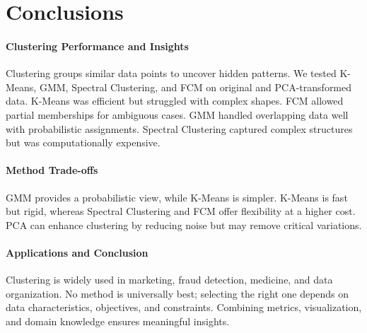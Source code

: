 \documentclass[11pt,a4paper]{article}
\begin{document}
\section{Conclusions}
\paragraph{Clustering Performance and Insights}
Clustering groups similar data points to uncover hidden patterns. We tested K-Means, GMM, Spectral Clustering, and FCM on original and PCA-transformed data. K-Means was efficient but struggled with complex shapes. FCM allowed partial memberships for ambiguous cases. GMM handled overlapping data well with probabilistic assignments. Spectral Clustering captured complex structures but was computationally expensive.

\paragraph{Method Trade-offs}
GMM provides a probabilistic view, while K-Means is simpler. K-Means is fast but rigid, whereas Spectral Clustering and FCM offer flexibility at a higher cost. PCA can enhance clustering by reducing noise but may remove critical variations.

\paragraph{Applications and Conclusion}
Clustering is widely used in marketing, fraud detection, medicine, and data organization. No method is universally best; selecting the right one depends on data characteristics, objectives, and constraints. Combining metrics, visualization, and domain knowledge ensures meaningful insights.
\end{document}
